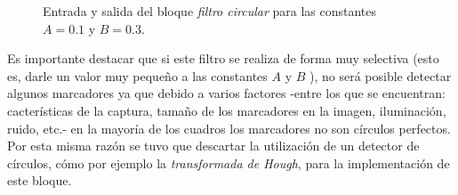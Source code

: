 \begin{figure}[H]
  \caption{Entrada y salida del bloque \emph{filtro circular} para las constantes $A = 0.1$ y $B = 0.3$.}
      \label{ejemplofiltrocirc}
\end{figure}

Es importante destacar que si este filtro se realiza de forma muy selectiva (esto es, darle un valor muy pequeño a las constantes $A$ y $B$ ), no será posible detectar algunos marcadores ya que debido a varios factores -entre los que se encuentran: cacterísticas de la captura, tamaño de los marcadores en la imagen, iluminación, ruido, etc.- en la mayoría de los cuadros los marcadores no son círculos perfectos. Por esta misma razón se tuvo que descartar la utilización de un detector de círculos, cómo por ejemplo la \textit{transformada de Hough}\cite{hough}, para la implementación de este bloque. 

